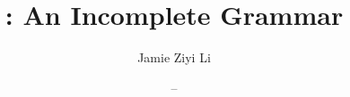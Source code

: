 \documentclass[11pt, a4paper, sidefootnotes, english]{pancake-book}
\begin{document}
\title{\langname: An Incomplete Grammar}
\author{Jamie Ziyi Li}
\date{ -- \DTMtoday}

\frontmatter
\maketitle
\tableofcontents
\listoftables
\listoffigures

\mainmatter




\backmatter
\printglossaries
\printbibliography
\end{document}
